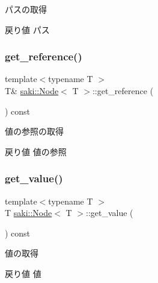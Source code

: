 パスの取得 

\begin{DoxyReturn}{戻り値}
パス 
\end{DoxyReturn}
\mbox{\label{classsaki_1_1_node_a91d632d4db82e0415f394b14c5f6ce58}} 
\subsubsection{\texorpdfstring{get\+\_\+reference()}{get\_reference()}}
{\footnotesize\ttfamily template$<$typename T $>$ \\
T\& \mbox{\hyperlink{classsaki_1_1_node}{saki\+::\+Node}}$<$ T $>$\+::get\+\_\+reference (\begin{DoxyParamCaption}{ }\end{DoxyParamCaption}) const\hspace{0.3cm}{\ttfamily [inline]}}



値の参照の取得 

\begin{DoxyReturn}{戻り値}
値の参照 
\end{DoxyReturn}
\mbox{\label{classsaki_1_1_node_a9e88537adb4d8b79fe456f2496ed1bca}} 
\subsubsection{\texorpdfstring{get\+\_\+value()}{get\_value()}}
{\footnotesize\ttfamily template$<$typename T $>$ \\
T \mbox{\hyperlink{classsaki_1_1_node}{saki\+::\+Node}}$<$ T $>$\+::get\+\_\+value (\begin{DoxyParamCaption}{ }\end{DoxyParamCaption}) const\hspace{0.3cm}{\ttfamily [inline]}}



値の取得 

\begin{DoxyReturn}{戻り値}
値 
\end{DoxyReturn}
\mbox{\label{classsaki_1_1_node_a520f9d300a014a99afd058fe0093d06f}} 
